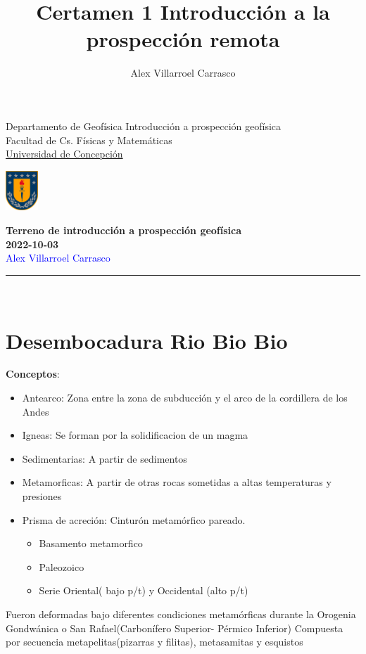 \documentclass{article}
\title{Certamen 1 Introducción a la prospección remota}
\author{Alex Villarroel Carrasco}
\theoremstyle{mytheoremstyle}
\theoremstyle{mytheoremstyle}
\theoremstyle{myproblemstyle}
\begin{document}
\usetikzlibrary{positioning}
	\pagestyle{plain}
	\begin{flushleft}
		Departamento de Geofísica \hfill Introducción a prospección geofísica\\
		Facultad de Cs. Físicas y Matemáticas\\
		\underline{Universidad de Concepción}
	\end{flushleft}
	
	\begin{flushright}\vspace{-5mm}
		\includegraphics[height=1.5cm]{escudo.png}
	\end{flushright}
	
	\begin{center}\vspace{-1cm}
		\textbf{\large Terreno de introducción a prospección geofísica\\2022-10-03}\\
		{\textcolor{blue}{Alex Villarroel Carrasco}}\\
	\end{center}
	\rule{\linewidth}{0.1mm}
	\\
    \section*{Desembocadura Rio Bio Bio}
    \textbf{Conceptos}:
    \begin{itemize}
        \item Antearco: Zona entre la zona de subducción y el arco de la cordillera de los Andes
        \item Igneas: Se forman por la solidificacion de un magma
        \item Sedimentarias: A partir de sedimentos
        \item Metamorficas: A partir de otras rocas sometidas a altas temperaturas y presiones
        \item Prisma de acreción: Cinturón metamórfico pareado.
        \begin{itemize}
            \item Basamento metamorfico
            \item Paleozoico
            \item Serie Oriental( bajo p/t) y Occidental (alto p/t)
        \end{itemize}
    \end{itemize}
    Fueron deformadas bajo diferentes condiciones metamórficas durante la Orogenia Gondwánica o San Rafael(Carbonífero Superior- Pérmico Inferior)
    Compuesta por secuencia metapelitas(pizarras y filitas), metasamitas y esquistos
\end{document}
